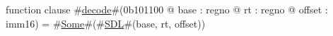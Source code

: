 function clause #\hyperref[zdecode]{decode}#(0b101100 @ base : regno @ rt : regno @ offset : imm16) =
      #\hyperref[zSome]{Some}#(#\hyperref[zSDL]{SDL}#(base, rt, offset))
